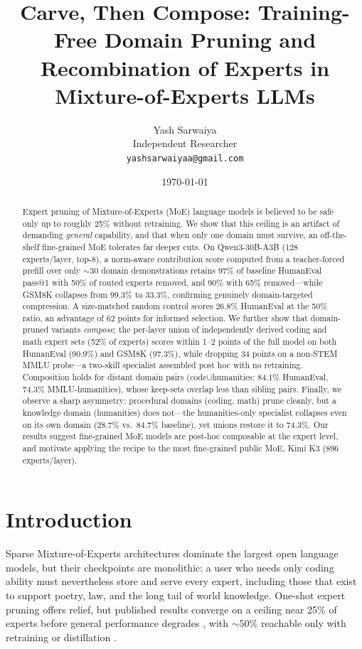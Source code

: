 \documentclass[11pt]{article}
\title{\textbf{Carve, Then Compose: Training-Free Domain Pruning and\\
Recombination of Experts in Mixture-of-Experts LLMs}}
\author{Yash Sarwaiya\\
\small Independent Researcher\\
\small \texttt{yashsarwaiyaa@gmail.com}}
\date{\today}
\begin{document}
\maketitle

\begin{abstract}
Expert pruning of Mixture-of-Experts (MoE) language models is believed to be
safe only up to roughly 25\% without retraining. We show that this ceiling is
an artifact of demanding \emph{general} capability, and that when only one
domain must survive, an off-the-shelf fine-grained MoE tolerates far deeper
cuts. On Qwen3-30B-A3B (128 experts/layer, top-8), a norm-aware contribution
score computed from a teacher-forced prefill over only ${\sim}30$ domain
demonstrations retains 97\% of baseline HumanEval pass@1 with 50\% of routed
experts removed, and 90\% with 65\% removed---while GSM8K collapses from
99.3\% to 33.3\%, confirming genuinely domain-targeted compression. A
size-matched random control scores 26.8\% HumanEval at the 50\% ratio, an
advantage of 62 points for informed selection. We further show that
domain-pruned variants \emph{compose}: the per-layer union of independently
derived coding and math expert sets (52\% of experts) scores within 1--2
points of the full model on both HumanEval (90.9\%) and GSM8K (97.3\%), while
dropping 34 points on a non-STEM MMLU probe---a two-skill specialist
assembled post hoc with no retraining. Composition holds for distant domain
pairs (code$\cup$humanities: 84.1\% HumanEval, 74.3\% MMLU-humanities), whose
keep-sets overlap less than sibling pairs. Finally, we observe a sharp
asymmetry: procedural domains (coding, math) prune cleanly, but a knowledge
domain (humanities) does not---the humanities-only specialist collapses even
on its own domain (28.7\% vs.\ 84.7\% baseline), yet unions restore it to
74.3\%. Our results suggest fine-grained MoE models are post-hoc composable at
the expert level, and motivate applying the recipe to the most fine-grained
public MoE, Kimi K3 (896 experts/layer).
\end{abstract}

\section{Introduction}

Sparse Mixture-of-Experts architectures dominate the largest open language
models, but their checkpoints are monolithic: a user who needs only coding
ability must nevertheless store and serve every expert, including those that
exist to support poetry, law, and the long tail of world knowledge. One-shot
expert pruning offers relief, but published results converge on a ceiling near
25\% of experts before general performance degrades \cite{heapr,mone,moei2},
with ${\sim}50\%$ reachable only with retraining or distillation
\cite{moepruner}.
\end{document}
